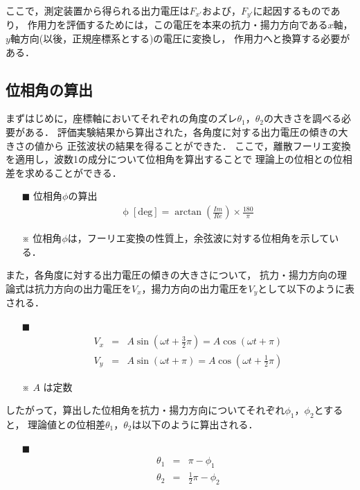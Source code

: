 \documentclass[twocolumn,a4j]{jsarticle}
\begin{document}
ここで，測定装置から得られる出力電圧は$F_{x'}$および，$F_{y'}$に起因するものであり，
作用力を評価するためには，この電圧を本来の抗力・揚力方向である$x$軸，$y$軸方向(以後，正規座標系とする)の電圧に変換し，
作用力へと換算する必要がある．\\

\subsection{位相角の算出}
まずはじめに，座標軸においてそれぞれの角度のズレ$\theta_1$，$\theta_2$の大きさを調べる必要がある．
評価実験結果から算出された，各角度に対する出力電圧の傾きの大きさの値から
正弦波状の結果を得ることができた．
ここで，離散フーリエ変換を適用し，波数1の成分について位相角を算出することで
理論上の位相との位相差を求めることができる．

\begin{itemize}
    \item [$\blacksquare$] 位相角$\phi$の算出
          \begin{eqnarray*}
              \mathrm{\phi \; [deg]} = \arctan \left(\frac{Im}{Re}\right) × \frac{180}{\pi}
          \end{eqnarray*}
    \item [※] 位相角$\phi$は，フーリエ変換の性質上，余弦波に対する位相角を示している．
\end{itemize}

また，各角度に対する出力電圧の傾きの大きさについて，
抗力・揚力方向の理論式は抗力方向の出力電圧を$V_{x}$，揚力方向の出力電圧を$V_{y}$として以下のように表される．

\begin{itemize}
    \item [$\blacksquare$] 
          \begin{eqnarray*}
              V_{x} &=& A \sin\left(\omega t + \frac{3}{2}\pi\right) = A \cos\left(\omega t + \pi\right)\\
              V_{y} &=& A \sin\left(\omega t + \pi\right) = A \cos\left(\omega t + \frac{1}{2}\pi\right)
          \end{eqnarray*}
    \item [※] $A$ は定数
\end{itemize}

したがって，算出した位相角を抗力・揚力方向についてそれぞれ$\phi_1$，$\phi_2$とすると，
理論値との位相差$\theta_1$，$\theta_2$は以下のように算出される．

\begin{itemize}
    \item [$\blacksquare$] 
          \begin{eqnarray*}
              \theta_1 &=& \pi - \phi_1\\
              \theta_2 &=& \frac{1}{2} \pi - \phi_2
          \end{eqnarray*}
\end{itemize}
\end{document}

